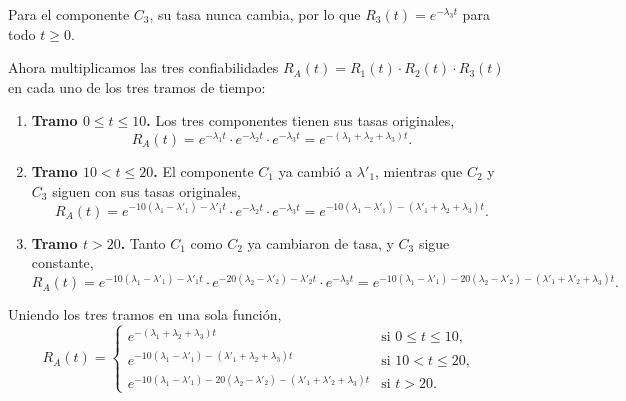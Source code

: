 \documentclass[practices.tex]{subfiles}%
\begin{document}
Para el componente $C_3$, su tasa nunca cambia, por lo que $R_3(t) = e^{-\lambda_3 t}$ para todo $t \ge 0$.

\vspace{3mm}
Ahora multiplicamos las tres confiabilidades $R_A(t) = R_1(t) \cdot R_2(t) \cdot R_3(t)$ en cada uno de los tres tramos de tiempo:

\begin{enumerate}
    \item \textbf{Tramo $0 \le t \le 10$.} Los tres componentes tienen sus tasas originales,
    \begin{equation*}
        R_A(t) = e^{-\lambda_1 t} \cdot e^{-\lambda_2 t} \cdot e^{-\lambda_3 t} = e^{-(\lambda_1 + \lambda_2 + \lambda_3)t}.
    \end{equation*}

    \item \textbf{Tramo $10 < t \le 20$.} El componente $C_1$ ya cambió a $\lambda'_1$, mientras que $C_2$ y $C_3$ siguen con sus tasas originales,
    \begin{equation*}
        R_A(t) = e^{-10(\lambda_1 - \lambda'_1) - \lambda'_1 t} \cdot e^{-\lambda_2 t} \cdot e^{-\lambda_3 t} = e^{-10(\lambda_1 - \lambda'_1) - (\lambda'_1 + \lambda_2 + \lambda_3)t}.
    \end{equation*}

    \item \textbf{Tramo $t > 20$.} Tanto $C_1$ como $C_2$ ya cambiaron de tasa, y $C_3$ sigue constante,
    \begin{equation*}
        R_A(t) = e^{-10(\lambda_1 - \lambda'_1) - \lambda'_1 t} \cdot e^{-20(\lambda_2 - \lambda'_2) - \lambda'_2 t} \cdot e^{-\lambda_3 t} = e^{-10(\lambda_1 - \lambda'_1) - 20(\lambda_2 - \lambda'_2) - (\lambda'_1 + \lambda'_2 + \lambda_3)t}.
    \end{equation*}
\end{enumerate}

\vspace{3mm}
Uniendo los tres tramos en una sola función,
\begin{equation*}
    R_A(t) = \begin{cases}
        e^{-(\lambda_1 + \lambda_2 + \lambda_3)t} & \text{si } 0 \le t \le 10, \\[2.5mm]
        e^{-10(\lambda_1 - \lambda'_1) - (\lambda'_1 + \lambda_2 + \lambda_3)t} & \text{si } 10 < t \le 20, \\[2.5mm]
        e^{-10(\lambda_1 - \lambda'_1) - 20(\lambda_2 - \lambda'_2) - (\lambda'_1 + \lambda'_2 + \lambda_3)t} & \text{si } t > 20.
    \end{cases}
\end{equation*}

\end{document}
